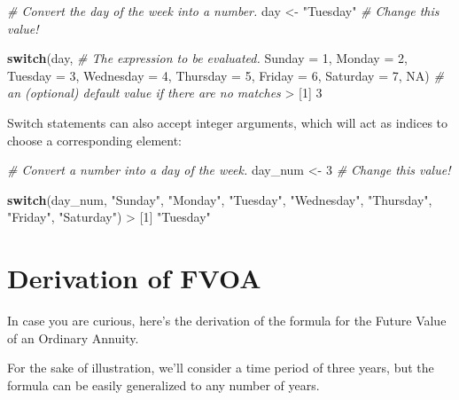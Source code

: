 \documentclass[
]{book}
\newenvironment{Shaded}{\begin{snugshade}}{\end{snugshade}}
\newcommand{\AttributeTok}[1]{\textcolor[rgb]{0.77,0.63,0.00}{#1}}
\newcommand{\CommentTok}[1]{\textcolor[rgb]{0.56,0.35,0.01}{\textit{#1}}}
\newcommand{\ConstantTok}[1]{\textcolor[rgb]{0.00,0.00,0.00}{#1}}
\newcommand{\ControlFlowTok}[1]{\textcolor[rgb]{0.13,0.29,0.53}{\textbf{#1}}}
\newcommand{\DecValTok}[1]{\textcolor[rgb]{0.00,0.00,0.81}{#1}}
\newcommand{\NormalTok}[1]{#1}
\newcommand{\OtherTok}[1]{\textcolor[rgb]{0.56,0.35,0.01}{#1}}
\newcommand{\SpecialCharTok}[1]{\textcolor[rgb]{0.00,0.00,0.00}{#1}}
\newcommand{\StringTok}[1]{\textcolor[rgb]{0.31,0.60,0.02}{#1}}
\begin{document}
\begin{Shaded}
\begin{Highlighting}[]
\CommentTok{\# Convert the day of the week into a number.}
\NormalTok{day }\OtherTok{\textless{}{-}} \StringTok{"Tuesday"} \CommentTok{\# Change this value!}

\ControlFlowTok{switch}\NormalTok{(day, }\CommentTok{\# The expression to be evaluated.}
  \AttributeTok{Sunday =} \DecValTok{1}\NormalTok{,}
  \AttributeTok{Monday =} \DecValTok{2}\NormalTok{,}
  \AttributeTok{Tuesday =} \DecValTok{3}\NormalTok{,}
  \AttributeTok{Wednesday =} \DecValTok{4}\NormalTok{,}
  \AttributeTok{Thursday =} \DecValTok{5}\NormalTok{,}
  \AttributeTok{Friday =} \DecValTok{6}\NormalTok{,}
  \AttributeTok{Saturday =} \DecValTok{7}\NormalTok{,}
  \ConstantTok{NA}\NormalTok{) }\CommentTok{\# an (optional) default value if there are no matches}
\SpecialCharTok{\textgreater{}}\NormalTok{ [}\DecValTok{1}\NormalTok{] }\DecValTok{3}
\end{Highlighting}
\end{Shaded}

Switch statements can also accept integer arguments, which will act as indices
to choose a corresponding element:

\begin{Shaded}
\begin{Highlighting}[]
\CommentTok{\# Convert a number into a day of the week.}
\NormalTok{day\_num }\OtherTok{\textless{}{-}} \DecValTok{3} \CommentTok{\# Change this value!}

\ControlFlowTok{switch}\NormalTok{(day\_num,}
  \StringTok{"Sunday"}\NormalTok{,}
  \StringTok{"Monday"}\NormalTok{,}
  \StringTok{"Tuesday"}\NormalTok{,}
  \StringTok{"Wednesday"}\NormalTok{,}
  \StringTok{"Thursday"}\NormalTok{,}
  \StringTok{"Friday"}\NormalTok{,}
  \StringTok{"Saturday"}\NormalTok{)}
\SpecialCharTok{\textgreater{}}\NormalTok{ [}\DecValTok{1}\NormalTok{] }\StringTok{"Tuesday"}
\end{Highlighting}
\end{Shaded}

\hypertarget{derivation-of-fvoa}{%
\section{Derivation of FVOA}\label{derivation-of-fvoa}}

In case you are curious, here's the derivation of the formula for the
Future Value of an Ordinary Annuity.

For the sake of illustration, we'll consider a time period of three years,
but the formula can be easily generalized to any number of years.
\end{document}
